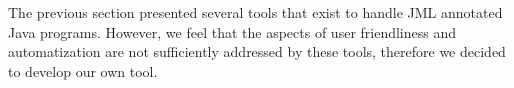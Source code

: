 \label{JavaAppletCorrectnessKit}



The previous section presented several tools that exist to handle JML annotated Java programs. However, we feel
 that the aspects of user friendliness and automatization are not sufficiently addressed by these tools,
therefore we  decided to develop our own tool.

